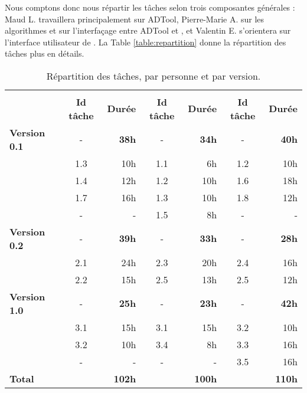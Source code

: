 		Nous comptons donc nous répartir les tâches selon trois composantes générales : Maud L. travaillera principalement sur ADTool, Pierre-Marie A. sur les algorithmes et sur l'interfaçage entre ADTool et \glasir{}, et Valentin E. s'orientera sur l'interface utilisateur de \glasir{}. La {\sc Table} \ref{table:repartition} donne la répartition des tâches plus en détails.
			


		\begin{table}[H]
			\centering
			\begin{tabular}{|l|c|r||c|r||c|r|}
				\hline
				\multirow{2}{*}{} & \nomRepart{Pierre-Marie A.} & \nomRepart{Valentin E.} & \nomRepartt{Maud L.}\\
				\cline{2-7}
				 & {\bf Id tâche} & {\bf Durée} & {\bf Id tâche} & {\bf Durée} & {\bf Id tâche} & {\bf Durée}\\
				\hline
				{\bf Version 0.1} & - & {\bf 38h} & - & {\bf 34h} & - & {\bf 40h}\\
				 & 1.3 & 10h & 1.1 & 6h & 1.2 & 10h\\
				 & 1.4 & 12h & 1.2 & 10h & 1.6 & 18h\\
				 & 1.7 & 16h & 1.3 & 10h & 1.8 & 12h\\
				 & - & - & 1.5 & 8h & - & -\\
				\hline
				{\bf Version 0.2} & - & {\bf 39h} & - & {\bf 33h} & - & {\bf 28h}\\
				 & 2.1 & 24h & 2.3 & 20h & 2.4 & 16h\\
				 & 2.2 & 15h & 2.5 & 13h & 2.5 & 12h\\
				\hline
				{\bf Version 1.0} & - & {\bf 25h} & - & {\bf 23h} & - & {\bf 42h}\\
				 & 3.1 & 15h & 3.1 & 15h & 3.2 & 10h\\
				 & 3.2 & 10h & 3.4 & 8h & 3.3 & 16h\\
				 & - & - & - & - & 3.5 & 16h\\
				\hline
				{\bf Total} & \multicolumn{2}{r||}{{\bf 102h}} & \multicolumn{2}{r||}{{\bf 100h}} & \multicolumn{2}{r|}{{\bf 110h}}\\
				\hline
			\end{tabular}
			\caption{Répartition des tâches, par personne et par version.}
			\label{table:repartition}
			\label{tab:repartition}
		\end{table}